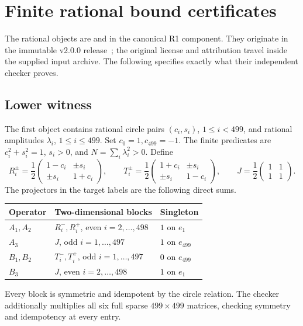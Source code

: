 \section{Finite rational bound certificates}\label{app:bounds}
The rational objects are  and
 in the canonical R1 component. They originate
in the immutable v2.0.0 release~\cite{Mghirbi2026data}; the original
license and attribution travel inside the supplied input archive.
The following specifies exactly what their independent checker proves.

\subsection{Lower witness}
The first object contains rational circle pairs \((c_i,s_i)\),
\(1\le i<499\), and rational amplitudes \(\lambda_i\),
\(1\le i\le499\). Set \(c_0=1,c_{499}=-1\). The finite predicates are
\(c_i^2+s_i^2=1\), \(s_i>0\), and \(N=\sum_i\lambda_i^2>0\).
Define
\[
 R_i^\pm=\frac12\begin{pmatrix}1-c_i&\pm s_i\\
                         \pm s_i&1+c_i\end{pmatrix},\qquad
 T_i^\pm=\frac12\begin{pmatrix}1+c_i&\pm s_i\\
                         \pm s_i&1-c_i\end{pmatrix},\qquad
 J=\frac12\begin{pmatrix}1&1\\1&1\end{pmatrix}.
\]
The projectors in the target labels are the following direct sums.
\begin{center}
\begin{tabular}{lll}
Operator & Two-dimensional blocks & Singleton\\ \hline
\(A_1,A_2\)&\(R_i^-,R_i^+\), even \(i=2,\ldots,498\)&\(1\) on \(e_1\)\\
\(A_3\)&\(J\), odd \(i=1,\ldots,497\)&\(1\) on \(e_{499}\)\\
\(B_1,B_2\)&\(T_i^-,T_i^+\), odd \(i=1,\ldots,497\)&\(0\) on \(e_{499}\)\\
\(B_3\)&\(J\), even \(i=2,\ldots,498\)&\(1\) on \(e_1\)
\end{tabular}
\end{center}
Every block is symmetric and idempotent by the circle relation. The
checker additionally multiplies all six full sparse \(499\times499\)
matrices, checking symmetry and idempotency at every entry.
